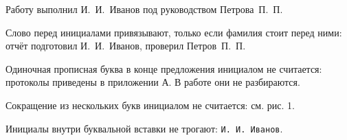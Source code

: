 Работу выполнил И.~И.~Иванов под руководством Петрова~П.~П.

Слово перед инициалами привязывают, только если фамилия стоит перед ними:
отчёт подготовил И.~И.~Иванов, проверил Петров~П.~П.

Одиночная прописная буква в конце предложения инициалом не считается:
протоколы приведены в приложении А. В работе они не разбираются.

Сокращение из нескольких букв инициалом не считается: см. рис. 1.

Инициалы внутри буквальной вставки не трогают: \verb|И. И. Иванов|.
